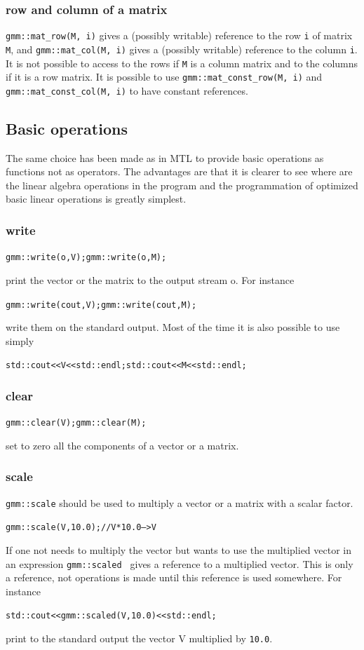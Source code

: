\documentclass[11pt,a4paper]{article}
\begin{document}
\subsubsection{row and column of a matrix}
{\tt gmm::mat_row(M, i)} gives a (possibly writable) reference to the row {\tt i} of matrix {\tt M}, and {\tt gmm::mat_col(M, i)}  gives a (possibly writable) reference to the column {\tt i}. It is not possible to access to the rows if {\tt M} is a column matrix and to the columns if it is a row matrix. It is possible to use {\tt gmm::mat_const_row(M, i)} and {\tt gmm::mat_const_col(M, i)} to have constant references.


\subsection{Basic operations}
The same choice has been made as in MTL to provide basic operations as functions not as operators. The advantages are that it is clearer to see where are the linear algebra operations in the program and the programmation of optimized basic linear operations is greatly simplest.

\subsubsection{write}
\begin{alltt}
  gmm::write(o, V); gmm::write(o, M);
\end{alltt}
print the vector or the matrix to the output stream o. For instance
\begin{alltt}
  gmm::write(cout, V); gmm::write(cout, M);
\end{alltt}
write them on the standard output.
Most of the time it is also possible to use simply
\begin{alltt}
  std::cout << V << std::endl; std::cout << M << std::endl;
\end{alltt}

\subsubsection{clear}
\begin{alltt}
  gmm::clear(V); gmm::clear(M);
\end{alltt}
set to zero all the components of a vector or a matrix.

\subsubsection{scale}
{\tt gmm::scale} should be used to multiply a vector or a matrix with a scalar factor.
\begin{alltt}
  gmm::scale(V, 10.0);  // V * 10.0 ---> V
\end{alltt}
If one not needs to multiply the vector but wants to use the multiplied vector in an expression  {\tt gmm::scaled } gives a reference to a multiplied vector. This is only a reference, not operations is made until this reference is used somewhere. For instance
\begin{alltt}
  std::cout << gmm::scaled(V, 10.0) << std::endl;
\end{alltt}
print to the standard output the vector V multiplied by {\tt 10.0}.
\end{document}
